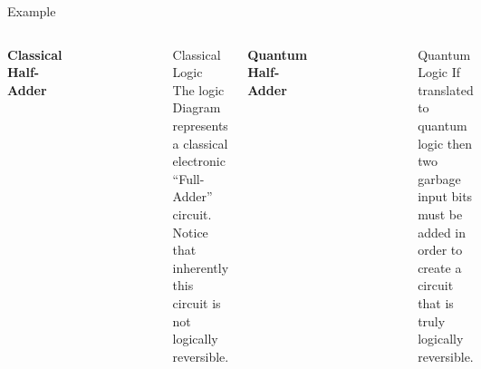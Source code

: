 \documentclass[pdf]{beamer}
\begin{document}
\begin{frame}{Example}
\begin{columns}
\vspace{-2 em}
\begin{center}
\textbf{Classical Half-Adder}
\end{center}
\vspace{-1 em}
\begin{figure}[ht]
\begin{center}
\includegraphics[scale=0.275]{figures/fulladder.png}
\end{center}
\end{figure}
\begin{block}{Classical Logic}
The logic Diagram represents a classical electronic ``Full-Adder'' circuit. Notice that inherently this circuit is not logically reversible. 
\end{block}
\vspace{-2 em}
\begin{center}
\textbf{Quantum Half-Adder}
\end{center}
\vspace{-1 em}
\begin{figure}[ht]
\begin{center}
  \includegraphics[scale=0.4]{figures/Full_adder_qc.png}
\end{center}
\end{figure}
\begin{block}{Quantum Logic}
If translated to quantum logic then two garbage input bits must be added in order to create a circuit that is truly logically reversible. 
\end{block}
\end{columns}

\end{frame}
\end{document}
